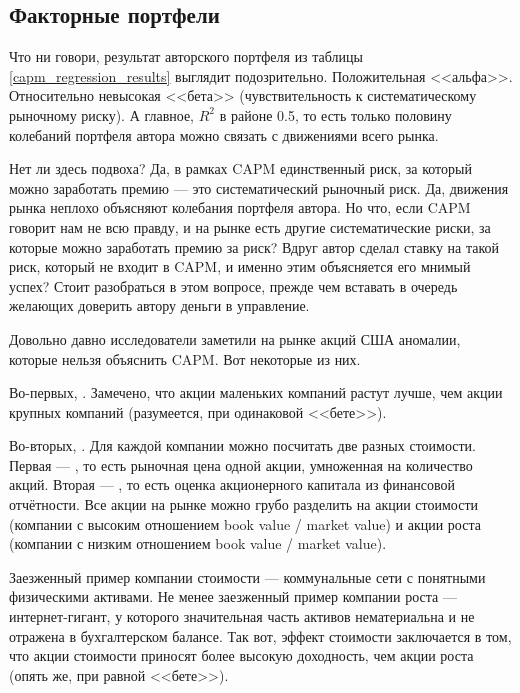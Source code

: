 \subsection{Факторные портфели}

Что ни говори, результат авторского портфеля из таблицы 
\ref{capm_regression_results} выглядит подозрительно. Положительная <<альфа>>. 
Относительно невысокая <<бета>> (чувствительность к систематическому рыночному 
риску). А главное, $R^2$ в районе 0.5, то есть только половину колебаний 
портфеля автора можно связать с движениями всего рынка.

Нет ли здесь подвоха? Да, в рамках CAPM единственный риск, за который можно 
заработать премию --- это систематический рыночный риск. Да, движения рынка 
неплохо объясняют колебания портфеля автора. Но что, если CAPM говорит нам не 
всю правду, и на рынке есть другие систематические риски, за которые можно 
заработать премию за риск? Вдруг автор сделал ставку на такой риск, который не 
входит в CAPM, и именно этим объясняется его мнимый успех? Стоит разобраться в 
этом вопросе, прежде чем вставать в очередь желающих доверить автору деньги в 
управление.

Довольно давно исследователи заметили на рынке акций США аномалии, которые 
нельзя объяснить CAPM. Вот некоторые из них.

Во-первых, . Замечено, что акции маленьких 
компаний растут лучше, чем акции крупных компаний (разумеется, при одинаковой 
<<бете>>).

Во-вторых, . Для каждой компании можно 
посчитать две разных стоимости. Первая --- , то есть рыночная цена одной акции, умноженная на количество акций. 
Вторая --- , то есть оценка 
акционерного капитала из финансовой отчётности. Все акции на рынке можно грубо 
разделить на акции стоимости (компании с высоким отношением book value / market 
value) и акции роста (компании с низким отношением book value / market value).

Заезженный пример компании стоимости --- коммунальные сети с понятными 
физическими активами. Не менее заезженный пример компании роста --- 
интернет-гигант, у которого значительная часть активов нематериальна и не 
отражена в бухгалтерском балансе. Так вот, эффект стоимости заключается в том, 
что акции стоимости приносят более высокую доходность, чем акции роста (опять 
же, при равной <<бете>>).

